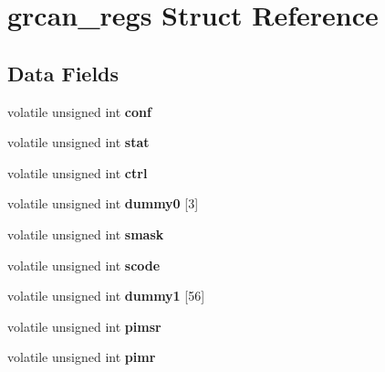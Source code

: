 \hypertarget{structgrcan__regs}{}\section{grcan\+\_\+regs Struct Reference}
\label{structgrcan__regs}
\subsection*{Data Fields}
\begin{DoxyCompactItemize}
\item 
\mbox{\label{structgrcan__regs_adf5a035aa3f8e7a7d57b2f027e9ea279}} 
volatile unsigned int {\bfseries conf}
\item 
\mbox{\label{structgrcan__regs_ac1223b80501954b7b2726ce6b6b34348}} 
volatile unsigned int {\bfseries stat}
\item 
\mbox{\label{structgrcan__regs_a53f738a2e23638a1b5bc89bdefa21be2}} 
volatile unsigned int {\bfseries ctrl}
\item 
\mbox{\label{structgrcan__regs_adc46630bd5fb263f379f56af343c00dd}} 
volatile unsigned int {\bfseries dummy0} \mbox{[}3\mbox{]}
\item 
\mbox{\label{structgrcan__regs_a7f2a98c92ea63ebdc911dd495d13f7dc}} 
volatile unsigned int {\bfseries smask}
\item 
\mbox{\label{structgrcan__regs_a33158fbbad3ece4d5e62e0778ea4ef0c}} 
volatile unsigned int {\bfseries scode}
\item 
\mbox{\label{structgrcan__regs_ac64f51a7fe0037306793a35baa97dc2e}} 
volatile unsigned int {\bfseries dummy1} \mbox{[}56\mbox{]}
\item 
\mbox{\label{structgrcan__regs_addbaaf8e46e00f151c54c4e66dfcddb3}} 
volatile unsigned int {\bfseries pimsr}
\item 
\mbox{\label{structgrcan__regs_a4ec085286fe2c36ee87d179726330eb1}} 
volatile unsigned int {\bfseries pimr}
\item 

\end{DoxyCompactItemize}
